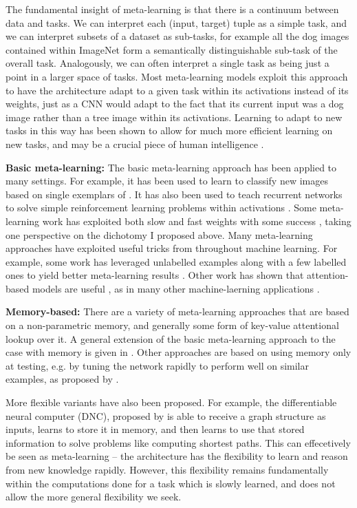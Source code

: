 \documentclass[11pt]{article}
\begin{document}
The fundamental insight of meta-learning is that there is a continuum between data and tasks. We can interpret each (input, target) tuple as a simple task, and we can interpret subsets of a dataset as sub-tasks, for example all the dog images contained within ImageNet form a semantically distinguishable sub-task of the overall task. Analogously, we can often interpret a single task as being just a point in a larger space of tasks. Most meta-learning models exploit this approach to have the architecture adapt to a given task within its activations instead of its weights, just as a CNN would adapt to the fact that its current input was a dog image rather than a tree image within its activations. Learning to adapt to new tasks in this way has been shown to allow for much more efficient learning on new tasks, and may be a crucial piece of human intelligence \citep{Hansen2017}. \par 
\textbf{Basic meta-learning:}
The basic meta-learning approach has been applied to many settings. For example, it has been used to learn to classify new images based on single exemplars of \citep{Vinyals2016}. It has also been used to teach recurrent networks to solve simple reinforcement learning problems within activations \citep{Duan2016, Wang2016a, Stadie2018}. Some meta-learning work has exploited both slow and fast weights with some success \citep[e.g.]{Munkhdalai2017}, taking one perspective on the dichotomy I proposed above. Many meta-learning approaches have exploited useful tricks from throughout machine learning. For example, some work has leveraged unlabelled examples along with a few labelled ones to yield better meta-learning results \citep[e.g.]{Ren2018}. Other work has shown that attention-based models are useful \citep{Reed2017}, as in many other machine-laerning applications \citep[e.g.]{Vaswani}. \par
\textbf{Memory-based:} There are a variety of meta-learning approaches that are based on a non-parametric memory, and generally some form of key-value attentional lookup over it. A general extension of the basic meta-learning approach to the case with memory is given in \citet{Santoro2016}. Other approaches are based on using memory only at testing, e.g. by tuning the network rapidly to perform well on similar examples, as proposed by \citet{Sprechmann2018}. \par 
More flexible variants have also been proposed. For example, the differentiable neural computer (DNC), proposed by \citet{Graves2016} is able to receive a graph structure as inputs, learns to store it in memory, and then learns to use that stored information to solve problems like computing shortest paths. This can effecetively be seen as meta-learning -- the architecture has the flexibility to learn and reason from new knowledge rapidly. However, this flexibility remains fundamentally within the computations done for a task which is slowly learned, and does not allow the more general flexibility we seek. \par
\end{document}
